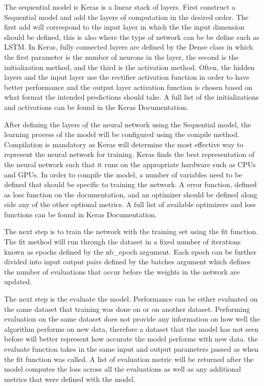 \documentclass[twocolumn]{webofc}
\begin{document}
The sequential model is Keras is a linear stack of layers. First construct a Sequential model and add the layers of computation in the desired order. The first add will correspond to the input layer in which the the input dimension should be defined, this is also where the type of network can be be define such as LSTM. In Keras, fully connected layers are defined by the Dense class in which the first parameter is the number of neurons in the layer, the second is the initialization method, and the third is the activation method. Often, the hidden layers and the input layer use the rectifier activation function in order to have better performance and the output layer activation function is chosen based on what format the intended predictions should take. A full list of the initializations and activations can be found in the Keras Documentation.

After defining the layers of the neural network using the Sequential model, the learning process of the model will be configured using the compile method. Compilation is mandatory as Keras will determine the most effective way to represent the neural network for training. Keras finds the best representation of the neural network such that it runs on the appropriate hardware such as CPUs and GPUs. In order to compile the model, a number of variables need to be defined that should be specific to training the network. A error function, defined as loss function on the documentation, and an optimizer should be defined along side any of the other optional metrics. A full list of available optimizers and loss functions can be found in Keras Documentation. 

The next step is to train the network with the training set using the fit function. The fit method will run through the dataset in a fixed number of iterations known as epochs defined by the nb\_epoch argument. Each epoch can be further divided into input output pairs defined by the batches argument which defines the number of evaluations that occur before the weights in the network are updated. 

The next step is the evaluate the model. Performance can be either evaluated on the same dataset that training was done on or on another dataset. Performing evaluation on the same dataset does not provide any information on how well the algorithm performs on new data, therefore a dataset that the model has not seen before will better represent how accurate the model performs with new data. the evaluate function takes in the same input and output parameters passed as when the fit function was called. A list of evaluation metric will be returned after the model computes the loss across all the evaluations as well as any additional metrics that were defined with the model. 
\end{document}
